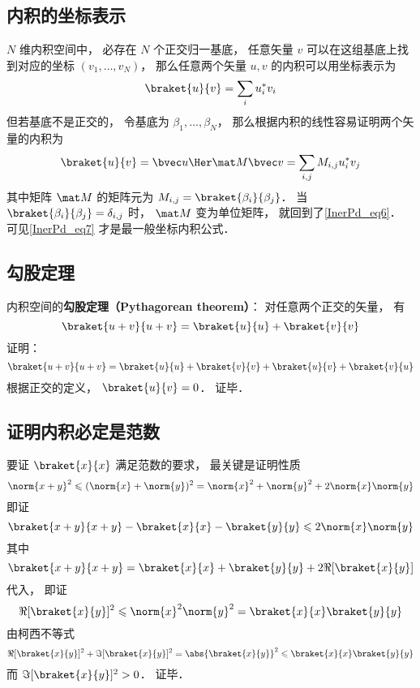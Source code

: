 \subsection{内积的坐标表示}
$N$ 维内积空间中， 必存在 $N$ 个正交归一基底， 任意矢量 $v$ 可以在这组基底上找到对应的坐标 $(v_1, \dots, v_N)$， 那么任意两个矢量 $u, v$ 的内积可以用坐标表示为
\begin{equation}\label{InerPd_eq6}
\braket{u}{v} = \sum_i u_i^* v_i
\end{equation}
但若基底不是正交的， 令基底为 $\beta_1, \dots, \beta_N$， 那么根据内积的线性容易证明两个矢量的内积为
\begin{equation}\label{InerPd_eq7}
\braket{u}{v} = \bvec u\Her \mat M \bvec v = \sum_{i,j} M_{i,j} u_i^* v_j
\end{equation}
其中矩阵 $\mat M$ 的矩阵元为 $M_{i,j} = \braket{\beta_i}{\beta_j}$． 当 $\braket{\beta_i}{\beta_j} = \delta_{i,j}$ 时， $\mat M$ 变为单位矩阵， 就回到了\autoref{InerPd_eq6}． 可见\autoref{InerPd_eq7} 才是最一般坐标内积公式．

\subsection{勾股定理}
内积空间的\textbf{勾股定理（Pythagorean theorem）}： 对任意两个正交的矢量， 有
\begin{equation}\label{InerPd_eq1}
\braket{u + v}{u + v} = \braket{u}{u} + \braket{v}{v}
\end{equation}
证明：
\begin{equation}
\braket{u + v}{u + v} = \braket{u}{u} + \braket{v}{v} + \braket{u}{v} + \braket{v}{u}
\end{equation}
根据正交的定义， $\braket{u}{v} = 0$． 证毕．

\subsection{证明内积必定是范数}
要证 $\braket{x}{x}$ 满足范数的要求， 最关键是证明性质
\begin{equation}
\norm{x+y}^2 \leqslant (\norm{x} + \norm{y})^2 = \norm{x}^2 + \norm{y}^2 + 2\norm{x}\norm{y}
\end{equation}
即证
\begin{equation}
\braket{x+y}{x+y} - \braket{x}{x} - \braket{y}{y} \leqslant 2\norm{x}\norm{y}
\end{equation}
其中
\begin{equation}
\braket{x+y}{x+y} = \braket{x}{x} + \braket{y}{y} + 2\Re[{\braket{x}{y}}]
\end{equation}
代入， 即证
\begin{equation}\label{InerPd_eq5}
\Re[{\braket{x}{y}}]^2 \leqslant \norm{x}^2\norm{y}^2 = \braket{x}{x}\braket{y}{y}
\end{equation}
由柯西不等式
\begin{equation}
\Re[\braket{x}{y}]^2 + \Im[\braket{x}{y}]^2 = \abs{\braket{x}{y}}^2 \leqslant \braket{x}{x}\braket{y}{y}
\end{equation}
而 $\Im[\braket{x}{y}]^2 > 0$． 证毕．

